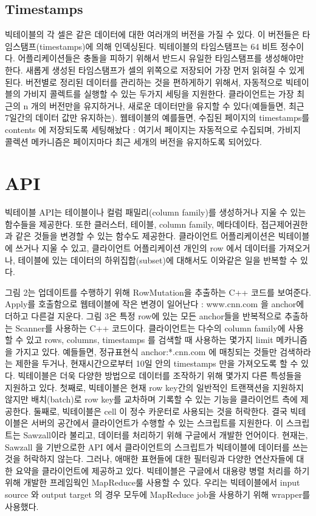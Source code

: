 \documentclass[twocolumn]{article}
\begin{document}
\subsection*{Timestamps}
 빅테이블의 각 셀은 같은 데이터에 대한 여러개의 버전을 가질 수 있다. 이 버전들은 타임스탬프(timestamps)에 의해 인덱싱된다. 빅테이블의 타임스탬프는 64 비트 정수이다.
 어플리케이션들은 충돌을 피하기 위해서 반드시 유일한 타임스탬프를 생성해야만 한다. 새롭게 생성된 타임스탬프가 셀의 위쪽으로 저장되어 가장 먼저 읽혀질 수 있게 된다. 버전별로 정리된 데이터를 관리하는 것을 편하게하기 위해서, 자동적으로 빅테이블의 가비지 콜렉트를 실행할 수 있는 두가지 세팅을 지원한다. 클라이언트는 가장 최근의 n 개의 버전만을 유지하거나, 새로운 데이터만을 유지할 수 있다(예들들면, 최근 7일간의 데이터 값만 유지하는).
웹테이블의 예를들면, 수집된 페이지의 timestamps를 contents 에 저장되도록 세팅해놨다 : 여기서 페이지는 자동적으로 수집되며, 가비지 콜렉션 메카니즘은 페이지마다 최근 세개의 버전을 유지하도록 되어있다.
 
 
\section{API}
 빅테이블 API는 테이블이나 컬럼 패밀리(column family)를 생성하거나 지울 수 있는 함수들을 제공한다. 또한 클러스터, 테이블, column family, 메타데이타, 접근제어권한과 같은 것들을 변경할 수 있는 함수도 제공한다.
클라이언트 어플리케이션은 빅테이블에 쓰거나 지울 수 있고, 클라이언트 어플리케이션 개인의 row 에서 데이터를 가져오거나, 테이블에 있는 데이터의 하위집합(subset)에 대해서도 이와같은 일을 반복할 수 있다.

 
 그림 2는 업데이트를 수행하기 위해 RowMutation을 추출하는 C++ 코드를 보여준다. Apply를 호출함으로 웹테이블에 작은 변경이 일어난다 : www.cnn.com 을 anchor에 더하고 다른걸 지운다.
그림 3은 특정 row에 있는 모든 anchor들을 반복적으로 추출하는 Scanner를 사용하는 C++ 코드이다. 클라이언트는 다수의 column family에 사용할 수 있고 rows, columns, timestamps 를 검색할 때 사용하는 몇가지 limit 메카니즘을 가지고 있다. 예들들면, 정규표현식 anchor:*.cnn.com 에 매칭되는 것들만 검색하라는 제한을 두거나, 현재시간으로부터 10일 안의 timestamps 만을 가져오도록 할 수 있다.
빅테이블은 더욱 다양한 방법으로 데이터를 조작하기 위해 몇가지 다른 특성들을 지원하고 있다. 첫째로, 빅테이블은 현재 row key간의 일반적인 트랜잭션을 지원하지 않지만 배치(batch)로 row key를 교차하며 기록할 수 있는 기능을 클라이언트 측에 제공한다. 둘째로, 빅테이블은 cell 이 정수 카운터로 사용되는 것을 허락한다. 결국 빅테이블은 서버의 공간에서 클라이언트가 수행할 수 있는 스크립트를 지원한다. 이 스크립트는 Sawzall이라 불리고, 데이터를 처리하기 위해 구글에서 개발한 언어이다. 현재는, Sawzall 을 기반으로한 API 에서 클라이언트의 스크립트가 빅테이블에 데이터를 쓰는 것을 허락하지 않는다. 그러나, 애매한 표현들에 대한 필터링과 다양한 연산자들에 대한 요약을 클라이언트에 제공하고 있다.
 빅테이블은 구글에서 대용량 병렬 처리를 하기위해 개발한 프레임웍인 MapReduce룰 사용할 수 있다. 우리는 빅테이블에서 input source 와 output target 의 경우 모두에 MapReduce job을 사용하기 위해 wrapper를 사용했다.
 
\end{document}
